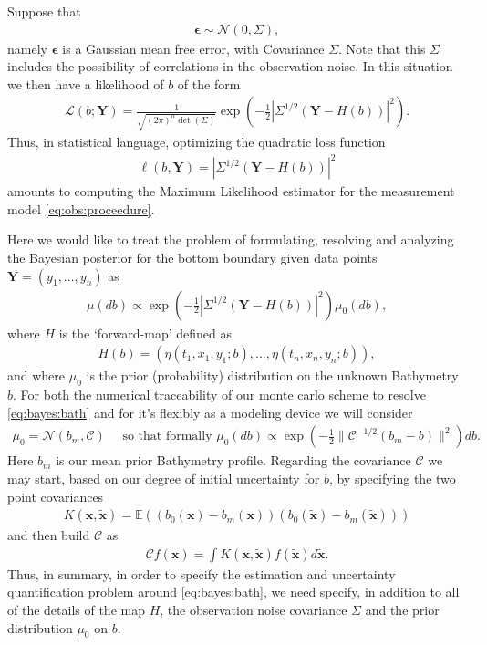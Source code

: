 \documentclass[18pt]{article}
\numberwithin{equation}{subsection}
\newcommand{\EE}{\mathbb{E}}
\newcommand{\beps}{\boldsymbol{\epsilon}}
\newcommand{\bfY}{\mathbf{Y}}
\newcommand{\cC}{\mathcal{C}}
\newcommand{\bfx}{\mathbf{x}}
\newcommand{\tbfx}{\tilde{\mathbf{x}}}
\begin{document}
Suppose that  
\begin{align}
\label{eq:gaussian:obs}
	\beps \sim \mathcal{N}(0, \Sigma), 
\end{align}
namely $\beps$ is a Gaussian mean free error, with Covariance $\Sigma$.  Note that this $\Sigma$ includes the possibility of correlations in the observation noise.  
In this situation we then have a  likelihood of $b$ of the form
\begin{align}
	\mathcal{L}(b; \bfY) = \frac{1}{\sqrt{ (2\pi)^n \det(\Sigma)}} \exp\left( -\frac{1}{2} | \Sigma^{1/2} (\bfY - H(b)) |^2\right).
\end{align}
Thus, in statistical language, optimizing the quadratic loss function
\begin{align}
 \ell(b, \bfY) = | \Sigma^{1/2} (\bfY - H(b)) |^2
\end{align}
amounts to computing the Maximum Likelihood estimator for the measurement model \eqref{eq:obs:proceedure}.


Here we would like to treat the problem of formulating, resolving and analyzing the Bayesian posterior 
for the bottom boundary given data points $\bfY= (y_1, …, y_n)$ as 
\begin{align}
	\label{eq:bayes:bath}
\mu(d b) \propto \exp\left( -\frac{1}{2} | \Sigma^{1/2} (\bfY - H(b)) |^2\right) \mu_0(db),
\end{align}
where $H$ is the `forward-map' defined as
\begin{align}
	\label{eq:forward:map}
	H(b) = (\eta(t_1, x_1, y_1; b), \ldots,  \eta(t_n, x_n, y_n; b)),
\end{align}
and where $\mu_0$ is the prior (probability) distribution on the unknown Bathymetry $b$.  For both the numerical
traceability of our monte carlo scheme to resolve \eqref{eq:bayes:bath} and for it's flexibly as a modeling device 
we will consider 
\begin{align}
\label{eq:gaussian:prior}
	\mu_0 = \mathcal{N}(b_m, \cC) \quad \text{ so that formally } 
	\mu_0(d b) \propto \exp( - \frac{1}{2} \| \cC^{-1/2} (b_m - b)\|^2) d b.
\end{align}
Here $b_m$ is our mean prior Bathymetry profile.  Regarding the covariance $\cC$ we may 
start, based on our degree of initial uncertainty for $b$, by specifying the two point covariances 
\begin{align}
\label{eq:2pt:cov:def}
	K(\bfx, \tbfx) = \EE(( b_0(\bfx) -  b_m(\bfx))(b_0(\tbfx) - b_m(\tbfx)))
\end{align}
and then build $\cC$ as
\begin{align}
\label{eq:cov:from:2pt}
	\cC f(\bfx) = \int K(\bfx, \tbfx) f(\tbfx) d \tbfx.
\end{align}
Thus, in summary,  in order to specify the estimation and uncertainty quantification problem around \eqref{eq:bayes:bath},
we need specify, in addition to all of the details of the map $H$, the observation noise covariance $\Sigma$
and the prior distribution $\mu_0$ on $b$.
\end{document}
